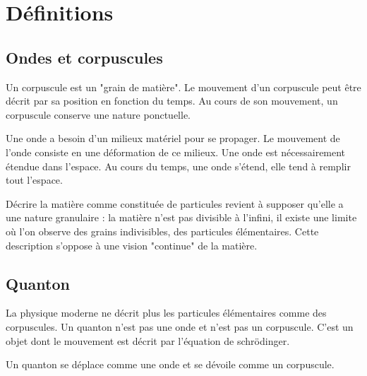 
\section{Définitions}
%
\subsection{Ondes et corpuscules}

Un corpuscule est un "grain de matière". Le mouvement d'un corpuscule peut être décrit par sa position en fonction du temps. Au cours de son mouvement, un corpuscule conserve une nature ponctuelle.


Une onde a besoin d'un milieux matériel pour se propager. Le mouvement de l'onde consiste en une déformation de ce milieux. Une onde est nécessairement étendue dans l'espace. Au cours du temps, une onde s'étend, elle tend à remplir tout l'espace.


Décrire la matière comme constituée de particules revient à supposer qu'elle a une nature granulaire : la matière n'est pas divisible à l'infini, il existe une limite où l'on observe des grains indivisibles, des particules élémentaires. Cette description s'oppose à une vision "continue" de la matière.



\subsection{Quanton}
%

La physique moderne ne décrit plus les particules élémentaires comme des corpuscules.
Un quanton n'est pas une onde et n'est pas un corpuscule. C'est un objet dont le mouvement est décrit par l'équation de schrödinger.

Un quanton se déplace comme une onde et se dévoile comme un corpuscule.

